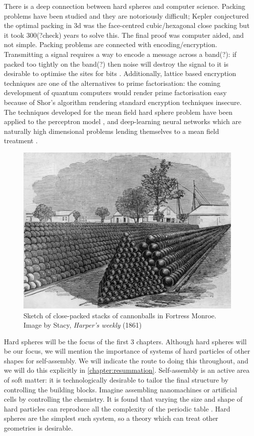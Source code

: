 \documentclass[11pt,twoside]{report}
\begin{document}
There is a deep connection between hard spheres and computer science.
Packing problems have been studied \cite{Cohn,Conway,Sloane} and they are notoriously difficult; Kepler conjectured the optimal packing in 3d was the face-centred cubic/hexagonal close packing but it took 300(?check) years to solve this.
The final proof was computer aided, and not simple.
Packing problems are connected with encoding/encryption.
Transmitting a signal requires a way to encode a message across a band(?): if packed too tightly on the band(?) then noise will destroy the signal to it is desirable to optimise the sites for bits \cite{Cohn,?,?}.
Additionally, lattice based encryption techniques are one of the alternatives to prime factorisation: the coming development of quantum computers \cite{?,?} would render prime factorisation easy because of Shor's algorithm \cite{Shor?} rendering standard encryption techniques insecure.
The techniques developed for the mean field hard sphere problem have been applied to the perceptron model \cite{?}, and deep-learning neural networks which are naturally high dimensional problems lending themselves to a mean field treatment \cite{?}.

\begin{figure}
  \includegraphics[width=0.75\linewidth,outer]{cannonballs}
  \caption[Close packed cannonballs]{
    Sketch of close-packed stacks of cannonballs in Fortress Monroe.
    Image by Stacy, \emph{Harper's weekly} (1861)}
  \label{fig:fcc}
\end{figure}

Hard spheres will be the focus of the first 3 chapters.
Although hard spheres will be our focus, we will mention the importance of systems of hard particles of other shapes for self-assembly.
We will indicate the route to doing this throughout, and we will do this explicitly in \ref{chapter:resummation}.
Self-assembly is an active area of soft matter: it is technologically desirable to tailor the final structure by controlling the building blocks.
Imagine assembling nanomachines or artificial cells by controlling the chemistry.
It is found that varying the size and shape of hard particles can reproduce all the complexity of the periodic table \cite{Glotzer?,Dijkstra?}.
Hard spheres are the simplest such system, so a theory which can treat other geometries is desirable.
\end{document}
